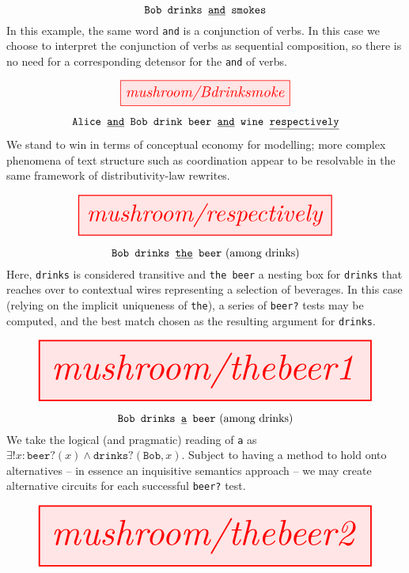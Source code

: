 \begin{myboxR}
\begin{example}\label{ex:syncat2}
\[\texttt{Bob drinks \underline{and} smokes}\]
In this example, the same word \texttt{and} is a conjunction of verbs. In this case we choose to interpret the conjunction of verbs as sequential composition, so there is no need for a corresponding detensor for the \texttt{and} of verbs.
\end{example}
\[\resizebox{0.5\textwidth}{!}{\tikzfig{mushroom/Bdrinksmoke}}\]
\end{myboxR}

\begin{myboxR}
\begin{example}\label{ex:coord}
\[\texttt{Alice \underline{and} Bob drink beer \underline{and} wine \underline{respectively}}\]
We stand to win in terms of conceptual economy for modelling; more complex phenomena of text structure such as coordination appear to be resolvable in the same framework of distributivity-law rewrites.
\end{example}
\[\resizebox{0.75\textwidth}{!}{\tikzfig{mushroom/respectively}}\]
\end{myboxR}

\begin{myboxR}
\begin{example}\label{ex:det1}
\[\texttt{Bob drinks \underline{the} beer} \text{ (among drinks)}\]
Here, \texttt{drinks} is considered transitive and \texttt{the beer} a nesting box for \texttt{drinks} that reaches over to contextual wires representing a selection of beverages. In this case (relying on the implicit uniqueness of \texttt{the}), a series of \texttt{beer?} tests may be computed, and the best match chosen as the resulting argument for \texttt{drinks}.
\end{example}
\[\resizebox{\textwidth}{!}{\tikzfig{mushroom/thebeer1}}\]
\end{myboxR}

\begin{myboxR}
\begin{example}\label{ex:det2}
\[\texttt{Bob drinks \underline{a} beer} \text{ (among drinks)}\]
We take the logical (and pragmatic) reading of \texttt{a} as $\exists ! x: \texttt{beer?}(x) \wedge \texttt{drinks?}(\texttt{Bob},x)$. Subject to having a method to hold onto alternatives -- in essence an inquisitive semantics approach -- we may create alternative circuits for each successful \texttt{beer?} test.
\end{example}
\[\resizebox{\textwidth}{!}{\tikzfig{mushroom/thebeer2}}\]
\end{myboxR}

